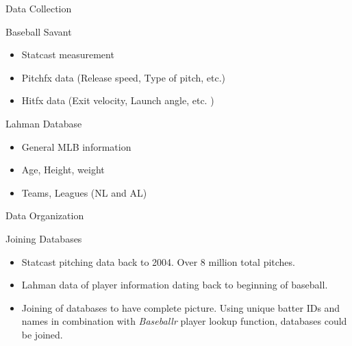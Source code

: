\documentclass[14pt]{bredelebeamer}
\begin{document}


\begin{frame}{Data Collection}
\begin{block}{Baseball Savant}
\begin{itemize}
\item Statcast measurement 
\item Pitchfx data (Release speed, Type of pitch, etc.)
\item Hitfx data (Exit velocity, Launch angle, etc. )
\end{itemize}
\end{block}
\begin{block}{Lahman Database}
\begin{itemize}
\item General MLB information 
\item Age, Height, weight
\item Teams, Leagues (NL and AL)
\end{itemize}
\end{block}

\end{frame}

\begin{frame}{Data Organization}
\begin{block}{\large Joining Databases}
\begin{itemize}
\item \large Statcast pitching data back to 2004. Over 8 million total pitches.
\item \large Lahman data of player information dating back to beginning of baseball.
\item \large Joining of databases to have complete picture. Using unique batter IDs and names in combination with \textit{Baseballr} player lookup function, databases could be joined.
\end{itemize}
\end{block}
\end{frame}
\end{document}
